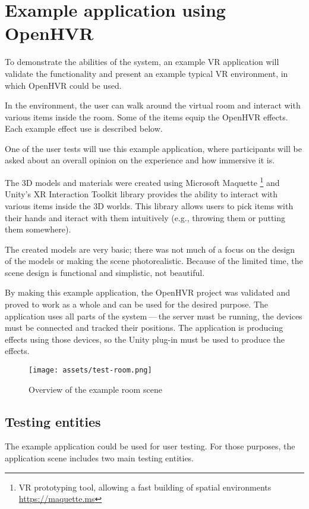 \chapter{Example application using OpenHVR}

To demonstrate the abilities of the system, an example VR application
will validate the functionality and present an example typical VR
environment, in which OpenHVR could be used.

In the environment, the user can walk around the virtual room and interact with
various items inside the room. Some of the items equip the OpenHVR
effects. Each example effect use is described below.

One of the user tests will use this example application, where
participants will be asked about an overall opinion on the experience and
how immersive it is.


The 3D models and materials were created using Microsoft Maquette
\footnote{VR prototyping tool, allowing a fast building of spatial environments \href{https://maquette.ms}{https://maquette.ms}}
and Unity’s XR Interaction Toolkit library provides the ability to
interact with various items inside the 3D worlds. This library allows users to
pick items with their hands and iteract with them intuitively (e.g., throwing them
or putting them somewhere).


The created models are very basic; there was not much of a focus on the design
of the models or making the scene photorealistic. Because of the limited time,
the scene design is functional and simplistic, not beautiful.


By making this example application, the OpenHVR project was validated and proved
to work as a whole and can be used for the desired purpose. The application uses
all parts of the system — the server must be running, the devices must be
connected and tracked their positions. The application is producing effects
using those devices, so the Unity plug-in must be used to produce the effects.


\begin{figure}[h]{}
\centering\texttt{[image: assets/test-room.png]}
\caption{Overview of the example room scene}

\end{figure}

\hypertarget{x-testing-entities}{\section{Testing entities}}
The example application could be used for user testing. For those purposes,
the application scene includes two main testing entities.


